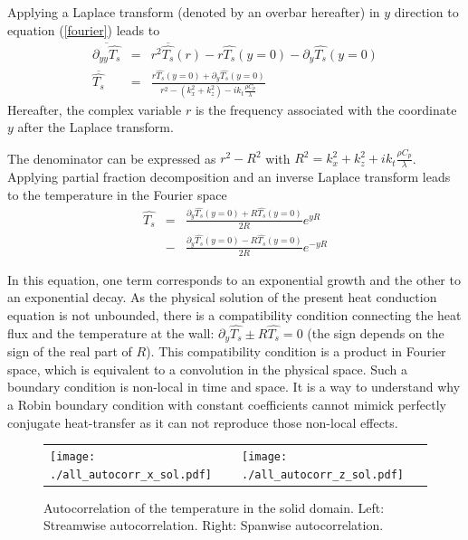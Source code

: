 \documentclass[review]{elsarticle}
\begin{document}
Applying a Laplace transform (denoted by an overbar hereafter) in $y$ direction to equation (\ref{fourier}) leads to %
\begin{eqnarray}\label{foulap}
\overline{\partial_{yy} \widehat{T_s}} & = & r^2 \overline{\widehat{T_s}}\left( r \right) - r \widehat{T_s}\left( y=0 \right) - \partial_y \widehat{T_s} \left( y=0 \right) \nonumber \\
\overline{\widehat{T_s}} & = & \frac{r \widehat{T_s}\left( y=0 \right) + \partial_y \widehat{T_s} \left( y=0 \right)}{r^2 - \left( k_x^2 + k_z^2 \right) - ik_t \frac{\rho C_p}{\lambda}}
\end{eqnarray}
Hereafter, the complex variable $r$ is the frequency associated with the coordinate $y$ after the Laplace transform.

The denominator can be expressed as $r^2 - R^2$ with $R^2=k_x^2 + k_z^2 + ik_t \frac{\rho C_p}{\lambda}$. Applying partial fraction decomposition and an inverse Laplace transform leads to the temperature in the Fourier space%
\begin{eqnarray}\label{invlap}
\widehat{T_s}  & = &  \frac{\partial_y \widehat{T_s} \left( y=0 \right) + R \widehat{T_s}\left( y=0 \right) }{2R} e^{yR} \nonumber \\
     & - & \frac{\partial_y \widehat{T_s} \left( y=0 \right) - R \widehat{T_s}\left( y=0 \right) }{2R} e^{-yR}
\end{eqnarray}

In this equation, one term corresponds to an exponential growth and the other to an exponential decay. As the physical solution of the present heat conduction equation is not unbounded, there is a compatibility condition connecting the heat flux and the temperature at the wall: $\partial_y \widehat{T_s} \pm R \widehat{T_s} = 0$ (the sign depends on the sign of the real part of $R$). This compatibility condition is a product in Fourier space, which is equivalent to a convolution in the physical space. Such a boundary condition is non-local in time and space. It is a way to understand why a Robin boundary condition with constant coefficients cannot mimick perfectly conjugate heat-transfer as it can not reproduce those non-local effects.

\begin{figure}[htbp]
\begin{tabular}[htbp]{ll}
\texttt{[image: ./all\_autocorr\_x\_sol.pdf]} &
\texttt{[image: ./all\_autocorr\_z\_sol.pdf]}
\end{tabular}
\caption{Autocorrelation of the temperature in the solid domain. Left: Streamwise autocorrelation. Right: Spanwise autocorrelation.}
\label{all_autocorr_solid}
\end{figure}
\end{document}
